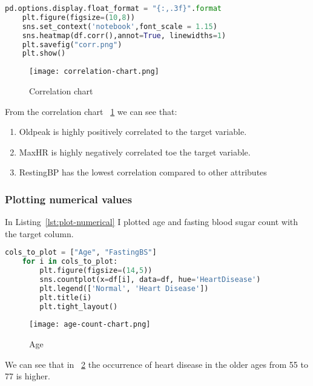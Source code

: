 \begin{lstlisting}[language=Python, caption={Correlation chart}]
	pd.options.display.float_format = "{:,.3f}".format
	plt.figure(figsize=(10,8))
	sns.set_context('notebook',font_scale = 1.15)
	sns.heatmap(df.corr(),annot=True, linewidths=1)
	plt.savefig("corr.png")
	plt.show()
\end{lstlisting}
\begin{figure}[htb]
	\centering
	\texttt{[image: correlation-chart.png]}
	\caption{Correlation chart}
	\label{fig:correlation-chart}
\end{figure}
From the correlation chart \figurename~\ref{fig:correlation-chart} we can see that:
\begin{enumerate}[label=(\roman*)]
	\item{Oldpeak is highly positively correlated to the target variable.}
	\item{MaxHR is highly negatively correlated toe the target variable.}
	\item{RestingBP has the lowest correlation compared to other attributes}
\end{enumerate}
\subsubsection{Plotting numerical values}
In Listing~\ref{lst:plot-numerical} I plotted age and fasting blood sugar count with the target column.
\begin{lstlisting}[language=Python, caption={Plotting select numerical features with target column}, label={lst:plot-numerical}]
	cols_to_plot = ["Age", "FastingBS"]
	for i in cols_to_plot:
		plt.figure(figsize=(14,5))
		sns.countplot(x=df[i], data=df, hue='HeartDisease')
		plt.legend(['Normal', 'Heart Disease'])
		plt.title(i)
		plt.tight_layout()
\end{lstlisting}

\begin{figure}[htb]
	\centering
	\texttt{[image: age-count-chart.png]}
	\caption{Age}
	\label{fig:age-count-chart}
\end{figure}
We can see that in \figurename~\ref{fig:age-count-chart} the occurrence of heart disease in the older ages from 55 to 77 is higher.

